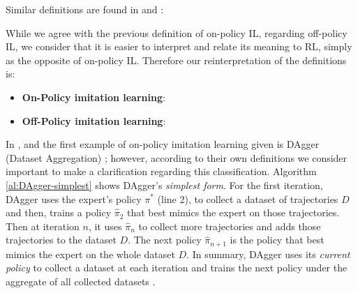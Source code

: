 
\setlength{\parskip}{1em} 

Similar definitions are found in \cite{OtherLaskeydefinitions:2019} and \cite{Anotherdefinitionfromberkeley:2020}:

 
\setlength{\parskip}{1em} 

While we agree with the previous definition of on-policy IL, regarding off-policy IL, we consider that it is easier to interpret and relate its meaning to RL, simply as the opposite of on-policy IL. Therefore our reinterpretation of the definitions is:  

\begin{itemize}
  \item \textbf{On-Policy imitation learning}: 
  
  \item \textbf{Off-Policy imitation learning}: 
  


\end{itemize}


In \cite{DBLP:journals/corr/LaskeyLHLMFG17}, \cite{OtherLaskeydefinitions:2019} and \cite{Osa:2018} the first example of on-policy imitation learning given is DAgger (Dataset  Aggregation) \cite{DAgger-Ross:2011}; however, according to their own definitions we consider important to make a clarification regarding this classification. Algorithm \ref{al:DAgger-simplest} shows DAgger's \textit{simplest form}. For the first iteration, DAgger uses the expert’s policy $\pi^*$ (line 2), to collect a dataset of trajectories $D$ and then, trains a policy  $\hat{\pi}_2$ that best mimics the expert on those trajectories. Then at iteration $n$, it uses $\hat{\pi}_n$ to collect more trajectories and adds those trajectories to the dataset $D$. The next policy $\hat{\pi}_{n+1}$ is the policy that best mimics the expert on the whole dataset $D$. In summary, DAgger uses its \textit{current policy} to collect a dataset at each iteration and trains the next policy under the aggregate of all collected datasets \cite{DAgger-Ross:2011}.

